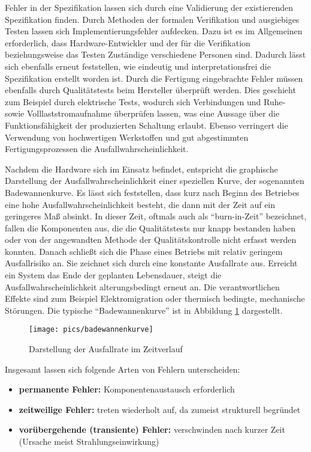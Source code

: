 Fehler in der Spezifikation lassen sich durch eine Validierung der
existierenden Spezifikation finden. Durch Methoden der formalen
Verifikation und ausgiebiges Testen lassen sich Implementierungsfehler
aufdecken. Dazu ist es im Allgemeinen erforderlich, dass
Hardware-Entwickler und der für die Verifikation beziehungsweise das
Testen Zuständige verschiedene Personen sind. Dadurch lässt sich
ebenfalls erneut feststellen, wie eindeutig und interpretationsfrei die
Spezifikation erstellt worden ist. Durch die Fertigung eingebrachte
Fehler müssen ebenfalls durch Qualitätstests beim Hersteller
überprüft werden. Dies geschieht zum Beispiel durch elektrische Tests, wodurch
sich Verbindungen und Ruhe- sowie Volllaststromaufnahme überprüfen
lassen, was eine Aussage über die Funktionsfähigkeit der produzierten
Schaltung erlaubt. Ebenso verringert die Verwendung von hochwertigen
Werkstoffen und gut abgestimmten Fertigungsprozessen die
Ausfallwahrscheinlichkeit.

Nachdem die Hardware sich im Einsatz befindet, entspricht die
graphische Darstellung der Ausfallwahrscheinlichkeit einer speziellen
Kurve, der sogenannten Badewannenkurve. Es lässt sich feststellen,
dass kurz nach Beginn des Betriebes eine hohe
Ausfallwahrscheinlichkeit besteht, die dann mit der Zeit auf ein
geringeres Maß absinkt. In dieser Zeit, oftmals auch als
``burn-in-Zeit'' bezeichnet, fallen die Komponenten aus, die die
Qualitätstests nur knapp bestanden haben oder von der angewandten
Methode der Qualitätskontrolle nicht erfasst werden konnten. Danach
schließt sich die Phase eines Betriebs mit relativ geringem
Ausfallrisiko an. Sie zeichnet sich durch eine konstante Ausfallrate
aus. Erreicht ein System das Ende der geplanten Lebensdauer, steigt
die Ausfallwahrscheinlichkeit alterungsbedingt erneut an. Die verantwortlichen Effekte
sind zum Beispiel Elektromigration oder thermisch bedingte,
mechanische Störungen. Die typische ``Badewannenkurve'' ist in
Abbildung \ref{fig:grundlagen_zuverlaessigkeit_badewannenkurve}
dargestellt.

\begin{figure}[htbp]
	\centering
        \texttt{[image: pics/badewannenkurve]}
	\caption{Darstellung der Ausfallrate im Zeitverlauf}
	\label{fig:grundlagen_zuverlaessigkeit_badewannenkurve}
\end{figure}

Insgesamt lassen sich folgende Arten von Fehlern unterscheiden:
\begin{itemize}
\item \textbf{permanente Fehler:} Komponentenaustausch erforderlich
\item \textbf{zeitweilige Fehler:} treten wiederholt auf, da zumeist
  strukturell begründet
\item \textbf{vorübergehende (transiente) Fehler:} verschwinden nach kurzer
  Zeit (Ursache meist Strahlungseinwirkung)
\end{itemize}

